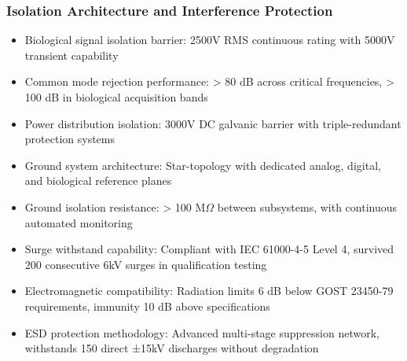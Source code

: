 \documentclass[12pt]{article}
\begin{document}
\subsubsection{Isolation Architecture and Interference Protection}
\begin{itemize}
    \item Biological signal isolation barrier: 2500V RMS continuous rating with 5000V transient capability
    \item Common mode rejection performance: > 80 dB across critical frequencies, > 100 dB in biological acquisition bands
    \item Power distribution isolation: 3000V DC galvanic barrier with triple-redundant protection systems
    \item Ground system architecture: Star-topology with dedicated analog, digital, and biological reference planes
    \item Ground isolation resistance: > 100 M$\Omega$ between subsystems, with continuous automated monitoring
    \item Surge withstand capability: Compliant with IEC 61000-4-5 Level 4, survived 200 consecutive 6kV surges in qualification testing
    \item Electromagnetic compatibility: Radiation limits 6 dB below GOST 23450-79 requirements, immunity 10 dB above specifications
    \item ESD protection methodology: Advanced multi-stage suppression network, withstands 150 direct ±15kV discharges without degradation
\end{itemize}
\end{document}
